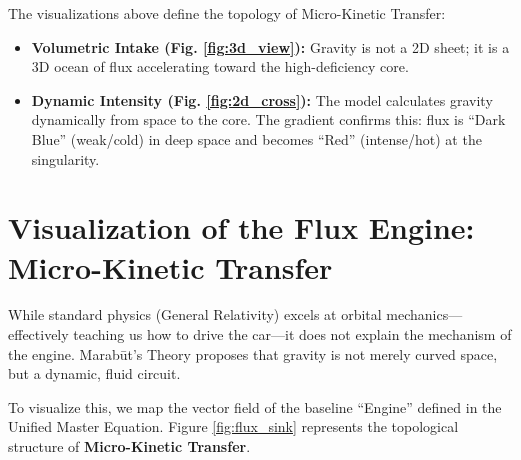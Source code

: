 \documentclass[11pt, a4paper]{article}
\begin{document}
The visualizations above define the topology of Micro-Kinetic Transfer:
\begin{itemize}
  \item \textbf{Volumetric Intake (Fig. \ref{fig:3d_view}):} Gravity is not a 2D sheet; it is a 3D ocean of flux accelerating toward the high-deficiency core.
  \item \textbf{Dynamic Intensity (Fig. \ref{fig:2d_cross}):} The model calculates gravity dynamically from space to the core. The gradient confirms this: flux is ``Dark Blue'' (weak/cold) in deep space and becomes ``Red'' (intense/hot) at the singularity.
\end{itemize}


\clearpage
\section{Visualization of the Flux Engine: Micro-Kinetic Transfer}

  While standard physics (General Relativity) excels at orbital mechanics—effectively teaching us how to drive the car—it does not explain the mechanism of the engine. Marab\={u}t's Theory proposes that gravity is not merely curved space, but a dynamic, fluid circuit.

  To visualize this, we map the vector field of the baseline ``Engine'' defined in the Unified Master Equation. Figure \ref{fig:flux_sink} represents the topological structure of \textbf{Micro-Kinetic Transfer}.
\end{document}
